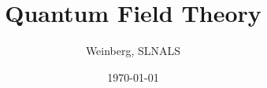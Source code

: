 \documentclass[12pt, a4paper]{book}
\begin{document}
\title{Quantum Field Theory}
\author{Weinberg, SLNALS}
\date{\today}
\maketitle

\tableofcontents



\end{document}
